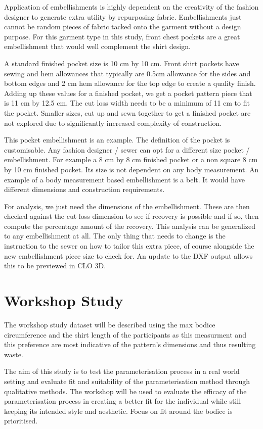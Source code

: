 Application of embellishments is highly dependent on the creativity of the fashion designer to generate extra utility by repurposing fabric. Embellishments just cannot be random pieces of fabric tacked onto the garment without a design purpose. For this garment type in this study, front chest pockets are a great embellishment that would well complement the shirt design. 

A standard finished pocket size is 10 cm by 10 cm. Front shirt pockets have sewing and hem allowances that typically are 0.5cm allowance for the sides and bottom edges and 2 cm hem allowance for the top edge to create a quality finish. Adding up these values for a finished pocket, we get a pocket pattern piece that is 11 cm by 12.5 cm. The cut loss width needs to be a minimum of 11 cm to fit the pocket. Smaller sizes, cut up and sewn together to get a finished pocket are not explored due to significantly increased complexity of construction.

This pocket embellishment is an example. The definition of the pocket is customisable. Any fashion designer / sewer can opt for a different size pocket / embellishment. For example a 8 cm by 8 cm finished pocket or a non square 8 cm by 10 cm finished pocket. Its size is not dependent on any body measurement. An example of a body measurement based embellishment is a belt. It would have different dimensions and construction requirements.

For analysis, we just need the dimensions of the embellishment. These are then checked against the cut loss dimension to see if recovery is possible and if so, then compute the percentage amount of the recovery. This analysis can be generalized to any embellishment at all. The only thing that needs to change is the instruction to the sewer on how to tailor this extra piece, of course alongside the new embellishment piece size to check for. An update to the DXF output allows this to be previewed in CLO 3D.

\section{Workshop Study}
The workshop study dataset will be described using the max bodice circumference and the shirt length of the participants as this measurment and this preference are most indicative of the pattern's dimensions and thus resulting waste.

The aim of this study is to test the parameterisation process in a real world setting and evaluate fit and suitability of the parameterisation method through qualitative methods. The workshop will be used to evaluate the efficacy of the parameterisation process in creating a better fit for the individual while still keeping its intended style and aesthetic. Focus on fit around the bodice is prioritised.

